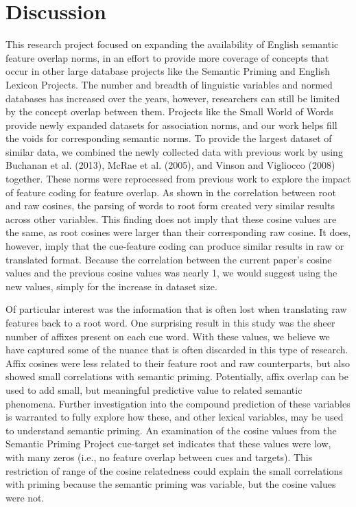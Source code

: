 \documentclass[english,,man]{apa6}
\theoremstyle{definition}
\theoremstyle{definition}
\theoremstyle{definition}
\theoremstyle{remark}
\begin{document}
\hypertarget{discussion}{%
\section{Discussion}\label{discussion}}

This research project focused on expanding the availability of English
semantic feature overlap norms, in an effort to provide more coverage of
concepts that occur in other large database projects like the Semantic
Priming and English Lexicon Projects. The number and breadth of
linguistic variables and normed databases has increased over the years,
however, researchers can still be limited by the concept overlap between
them. Projects like the Small World of Words provide newly expanded
datasets for association norms, and our work helps fill the voids for
corresponding semantic norms. To provide the largest dataset of similar
data, we combined the newly collected data with previous work by using
Buchanan et al. (2013), McRae et al. (2005), and Vinson and Vigliocco
(2008) together. These norms were reprocessed from previous work to
explore the impact of feature coding for feature overlap. As shown in
the correlation between root and raw cosines, the parsing of words to
root form created very similar results across other variables. This
finding does not imply that these cosine values are the same, as root
cosines were larger than their corresponding raw cosine. It does,
however, imply that the cue-feature coding can produce similar results
in raw or translated format. Because the correlation between the current
paper's cosine values and the previous cosine values was nearly 1, we
would suggest using the new values, simply for the increase in dataset
size.

Of particular interest was the information that is often lost when
translating raw features back to a root word. One surprising result in
this study was the sheer number of affixes present on each cue word.
With these values, we believe we have captured some of the nuance that
is often discarded in this type of research. Affix cosines were less
related to their feature root and raw counterparts, but also showed
small correlations with semantic priming. Potentially, affix overlap can
be used to add small, but meaningful predictive value to related
semantic phenomena. Further investigation into the compound prediction
of these variables is warranted to fully explore how these, and other
lexical variables, may be used to understand semantic priming. An
examination of the cosine values from the Semantic Priming Project
cue-target set indicates that these values were low, with many zeros
(i.e., no feature overlap between cues and targets). This restriction of
range of the cosine relatedness could explain the small correlations
with priming because the semantic priming was variable, but the cosine
values were not.
\end{document}
